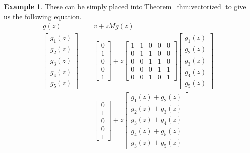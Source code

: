 \documentclass[a4paper]{article}
\theoremstyle{definition}
\theoremstyle{definition}
\newtheorem{example}{Example}[section]
\theoremstyle{definition}
\begin{document}
\begin{example}
    These can be simply placed into Theorem~\ref{thm:vectorized} to give us the following equation.
    \begin{align*}
        g(z) &= v + z M g(z) \\[1em]
        \begin{bmatrix}
           g_1(z) \\
           g_2(z) \\
           g_3(z) \\
           g_4(z) \\
           g_5(z)
         \end{bmatrix} &= \begin{bmatrix}
           0 \\
           1 \\
           0 \\
           0 \\
           1
         \end{bmatrix} + z \begin{bmatrix}
           1 & 1 & 0 & 0 & 0 \\
           0 & 1 & 1 & 0 & 0 \\
           0 & 0 & 1 & 1 & 0 \\
           0 & 0 & 0 & 1 & 1 \\
           0 & 0 & 1 & 0 & 1
         \end{bmatrix} \begin{bmatrix}
           g_1(z) \\
           g_2(z) \\
           g_3(z) \\
           g_4(z) \\
           g_5(z)
         \end{bmatrix} \\[1em]
         &= \begin{bmatrix}
           0 \\
           1 \\
           0 \\
           0 \\
           1
         \end{bmatrix} + z \begin{bmatrix}
           g_1(z) + g_2(z) \\
           g_2(z) + g_3(z) \\
           g_3(z) + g_4(z) \\
           g_4(z) + g_5(z) \\
           g_3(z) + g_5(z)
         \end{bmatrix} \\[1em]

\end{align*}
\end{example}
\end{document}
